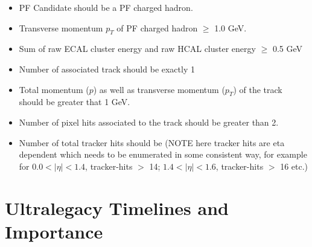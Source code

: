 \documentclass{article}
\begin{document}
\begin{itemize}
\item PF Candidate should be a PF charged hadron.
\item Transverse momentum $p_T$ of PF charged hadron $\geq$ 1.0 GeV.
\item Sum of raw ECAL cluster energy and raw HCAL cluster energy $\geq$ 0.5 GeV
\item Number of associated track should be exactly 1
\item Total momentum ($p$) as well as transverse momentum ($p_T$) of the track should be greater that 1 GeV.
\item Number of pixel hits associated to the track should be greater than 2.
\item Number of total tracker hits should be (NOTE here tracker hits are eta dependent which needs to be enumerated in some consistent way, for example for $0.0 < |\eta| < 1.4$, tracker-hits $>$ 14; $1.4 < |\eta| < 1.6$, tracker-hits $>$ 16 etc.)
\end{itemize}

\vspace*{0.5cm}
\par
\large
\section{Ultralegacy Timelines and Importance }
\end{document}
